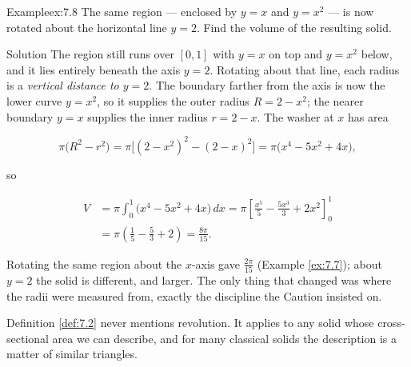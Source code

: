 \documentclass[a4paper,12pt,oneside]{memoir}
\begin{document}
\begin{workedexample}
\begin{envexample}{Example}{ex:7.8}{}
The same region — enclosed by \(y = x\) and \(y = x^{2}\) — is now rotated about the horizontal line \(y = 2\). Find the volume of the resulting solid.
\end{envexample}
\begin{envsolution}{Solution}{}{}
The region still runs over \([0, 1]\) with \(y = x\) on top and \(y = x^{2}\) below, and it lies entirely beneath the axis \(y = 2\). Rotating about that line, each radius is a \emph{vertical distance to \(y = 2\)}. The boundary farther from the axis is now the lower curve \(y = x^{2}\), so it supplies the outer radius \(R = 2 - x^{2}\); the nearer boundary \(y = x\) supplies the inner radius \(r = 2 - x\). The washer at \(x\) has area

\[ \pi\bigl(R^{2} - r^{2}\bigr) = \pi\bigl[(2 - x^{2})^{2} - (2 - x)^{2}\bigr] = \pi\bigl(x^{4} - 5x^{2} + 4x\bigr), \]

so

\[ \begin{aligned}
          V &= \pi\int_{0}^{1} \bigl(x^{4} - 5x^{2} + 4x\bigr)\,dx = \pi\left[\frac{x^{5}}{5} - \frac{5x^{3}}{3} + 2x^{2}\right]_{0}^{1} \\[2pt]
            &= \pi\left(\frac{1}{5} - \frac{5}{3} + 2\right) = \frac{8\pi}{15}.
        \end{aligned} \]

Rotating the same region about the \(x\)-axis gave \(\tfrac{2\pi}{15}\) (Example \ref{ex:7.7}); about \(y = 2\) the solid is different, and larger. The only thing that changed was where the radii were measured from, exactly the discipline the Caution insisted on. \qedmark
\end{envsolution}
\end{workedexample}
Definition \ref{def:7.2} never mentions revolution. It applies to any solid whose cross-sectional area we can describe, and for many classical solids the description is a matter of similar triangles.
\end{document}

